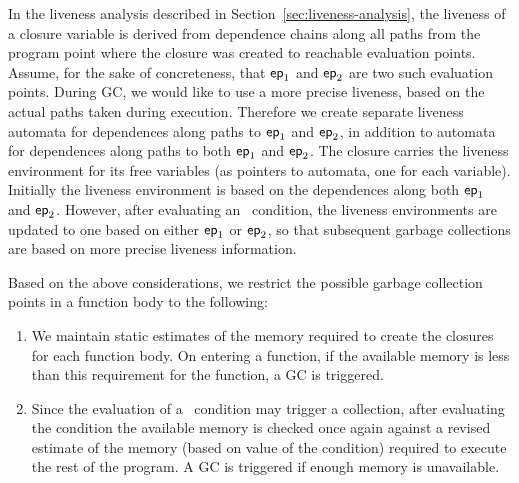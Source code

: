 \documentclass[9pt]{sigplanconf}
\begin{document}
In        the       liveness        analysis       described        in
Section~\ref{sec:liveness-analysis},   the  liveness   of  a   closure
variable is  derived from dependence  chains along all paths  from the
program point  where the closure  was created to  reachable evaluation
points.  Assume,  for the  sake of  concreteness, that  $\mathsf{ep}_1$ and
$\mathsf{ep}_2$ are two such evaluation points.  During GC,
we would like to use a more precise liveness, based on the actual paths
taken  during  execution.   Therefore   we  create  separate  liveness
automata for dependences  along paths to $\mathsf{ep}_1$  and $\mathsf{ep}_2$, in
addition to  automata for dependences  along paths to  both $\mathsf{ep}_1$
and $\mathsf{ep}_2$.  The closure carries  the liveness environment for its
free  variables (as  pointers  to automata,  one  for each  variable).
Initially the liveness  environment is based on  the dependences along
both  $\mathsf{ep}_1$   and  $\mathsf{ep}_2$.   However,  after   evaluating  an
\SIF\ condition, the liveness environments are updated to one based on
either   $\mathsf{ep}_1$  or   $\mathsf{ep}_2$,  so   that  subsequent   garbage
collections are based on more precise liveness information.

Based on  the above considerations,  we restrict the  possible garbage
collection points in a function body to the following:
\begin{enumerate}
\item We  maintain static estimates  of the memory required  to create
  the closures for each function body.  On entering a function, if the
  available memory is  less than this requirement for  the function, a
  GC is triggered.
\item Since the evaluation of a  \SIF\ condition may trigger a 
  collection, after evaluating the condition   the available memory
  is  checked once  again against  a  revised estimate  of the  memory
  (based on  value of the condition)  required to execute the  rest of
  the program.  A GC is triggered if enough memory is unavailable.
\end{enumerate}



\end{document}
